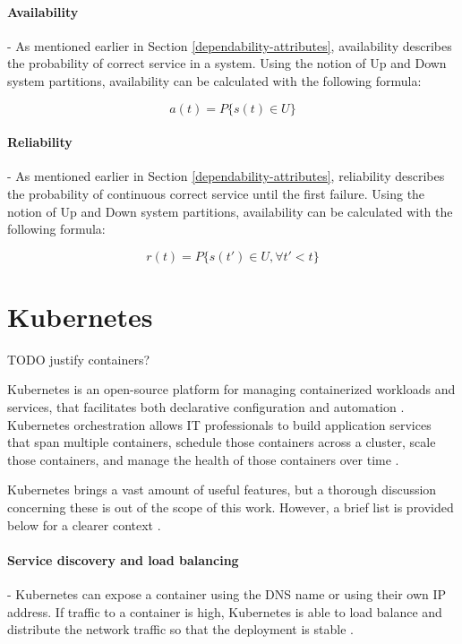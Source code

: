 \paragraph{Availability} - As mentioned earlier in Section \ref{dependability-attributes}, availability describes the probability of correct service in a system. Using the notion of Up and Down system partitions, availability can be calculated with the following formula:

\[
a(t) = P\{ s(t) \in U \}
\]

\paragraph{Reliability} - As mentioned earlier in Section \ref{dependability-attributes}, reliability describes the probability of continuous correct service until the first failure. Using the notion of Up and Down system partitions, availability can be calculated with the following formula:

\[
r(t) = P\{ s(t') \in U, \forall t' < t \}
\]


\section{Kubernetes}

TODO justify containers?

Kubernetes is an open-source platform for managing containerized workloads and services, that facilitates both declarative configuration and automation \cite{KubernetesOverview}. Kubernetes orchestration allows IT professionals to build application services that span multiple containers, schedule those containers across a cluster, scale those containers, and manage the health of those containers over time \cite{KubernetesOverviewRH}.

Kubernetes brings a vast amount of useful features, but a thorough discussion concerning these is out of the scope of this work. However, a brief list is provided below for a clearer context \cite{KubernetesOverview}.

\paragraph{Service discovery and load balancing} - Kubernetes can expose a container using the DNS name or using their own IP address. If traffic to a container is high, Kubernetes is able to load balance and distribute the network traffic so that the deployment is stable \cite{KubernetesOverview}.


